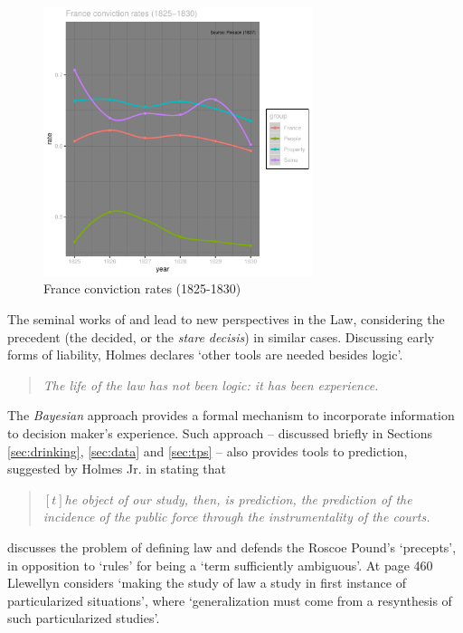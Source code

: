 \documentclass[a4paper]{exam}
\theoremstyle{plain}
\begin{document}
\begin{figure}[ht]
\begin{center}
\includegraphics[width=0.7\textwidth]{doj-poisson}
\caption{France conviction rates (1825-1830)}
\label{fig:poisson}
\end{center}
\end{figure}

The seminal works of \cite{holmes1881common} and \cite{holmes1897path} lead to new perspectives in the Law, considering the precedent (the decided, or the \textit{stare decisis}) in similar cases. Discussing early forms of liability, Holmes declares `other tools are needed besides logic'.
\begin{quote}
\textit{The life of the law has not been logic: it has been experience.} \cite[p. 5]{holmes1881common}
\end{quote}
The \textit{Bayesian} approach provides a formal mechanism to incorporate information to decision maker's experience. Such approach -- discussed briefly in Sections \ref{sec:drinking}, \ref{sec:data} and \ref{sec:tps} -- also provides tools to prediction, suggested by Holmes Jr. in stating that
\begin{quote}
\textit{$\left[t\right]$he object of our study, then, is prediction, the prediction of the incidence of the public force through the instrumentality of the courts.} \cite[p. 1]{holmes1897path}
\end{quote}

\cite{llewellyn1930realistic} discusses the problem of defining law and defends the Roscoe Pound's `precepts', in opposition to `rules' for being a `term sufficiently ambiguous'. At page 460 Llewellyn considers `making the study of law a study in first instance of particularized situations', where `generalization must come from a resynthesis of such particularized studies'.
\end{document}
